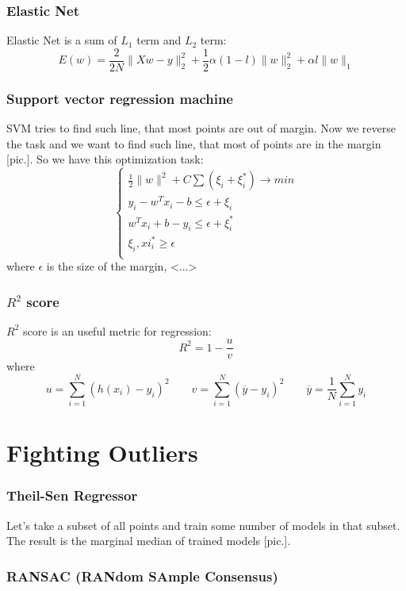 \subsubsection*{Elastic Net}

Elastic Net is a sum of $L_1$ term and $L_2$ term:
$$E(w)=\frac{2}{2N}\|Xw-y\|_2^2+\frac{1}{2}\alpha(1-l)\|w\|_2^2+\alpha l\|w\|_1$$

\subsubsection*{Support vector regression machine}

SVM tries to find such line, that most points are out of margin. Now we reverse the task and we want to find such line, that most of points are in the margin [pic.]. So we have this optimization task:
$$\begin{cases}
	\frac{1}{2}\|w\|^2+C\sum(\xi_i+\xi_i^*)\to min \\
	y_i-w^Tx_i-b\le\epsilon+\xi_i \\
	w^Tx_i+b-y_i\le\epsilon+\xi_i^* \\
	\xi_i,xi_i^* \ge \epsilon \\
\end{cases}$$
where $\epsilon$ is the size of the margin, <...>

\subsubsection*{$R^2$ score}

$R^2$ score is an useful metric for regression:
$$R^2=1-\frac{u}{v}$$
where
$$u=\sum\limits_{i=1}^{N}(h(x_i)-y_i)^2\qquad v=\sum\limits_{i=1}^{N}(\overline{y}-y_i)^2\qquad \overline{y}=\frac{1}{N}\sum\limits_{i=1}^{N}y_i$$

\section{Fighting Outliers}
\vspace{-0.6cm}
\subsubsection*{Theil-Sen Regressor}

Let's take a subset of all points and train some number of models in that subset. The result is the marginal median of trained models [pic.].

\subsubsection*{RANSAC (RANdom SAmple Consensus)}


